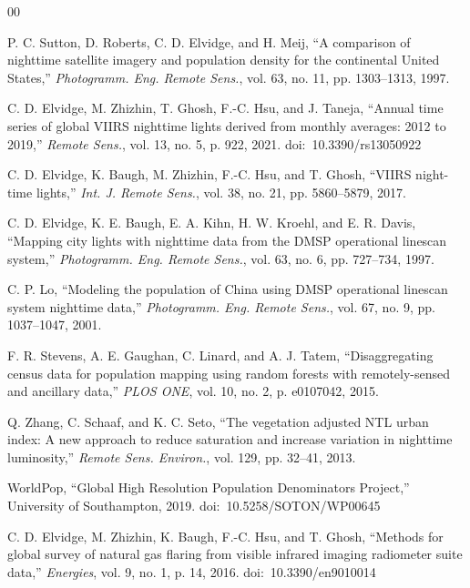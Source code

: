 \documentclass[conference]{IEEEtran}
\begin{document}
\begin{thebibliography}{00}

P. C. Sutton, D. Roberts, C. D. Elvidge, and H. Meij, ``A comparison of nighttime satellite imagery and population density for the continental United States,'' \textit{Photogramm. Eng. Remote Sens.}, vol. 63, no. 11, pp. 1303--1313, 1997.

C. D. Elvidge, M. Zhizhin, T. Ghosh, F.-C. Hsu, and J. Taneja, ``Annual time series of global VIIRS nighttime lights derived from monthly averages: 2012 to 2019,'' \textit{Remote Sens.}, vol. 13, no. 5, p. 922, 2021. doi:~10.3390/rs13050922

C. D. Elvidge, K. Baugh, M. Zhizhin, F.-C. Hsu, and T. Ghosh, ``VIIRS night-time lights,'' \textit{Int. J. Remote Sens.}, vol. 38, no. 21, pp. 5860--5879, 2017.

C. D. Elvidge, K. E. Baugh, E. A. Kihn, H. W. Kroehl, and E. R. Davis, ``Mapping city lights with nighttime data from the DMSP operational linescan system,'' \textit{Photogramm. Eng. Remote Sens.}, vol. 63, no. 6, pp. 727--734, 1997.

C. P. Lo, ``Modeling the population of China using DMSP operational linescan system nighttime data,'' \textit{Photogramm. Eng. Remote Sens.}, vol. 67, no. 9, pp. 1037--1047, 2001.

F. R. Stevens, A. E. Gaughan, C. Linard, and A. J. Tatem, ``Disaggregating census data for population mapping using random forests with remotely-sensed and ancillary data,'' \textit{PLOS ONE}, vol. 10, no. 2, p. e0107042, 2015.

Q. Zhang, C. Schaaf, and K. C. Seto, ``The vegetation adjusted NTL urban index: A new approach to reduce saturation and increase variation in nighttime luminosity,'' \textit{Remote Sens. Environ.}, vol. 129, pp. 32--41, 2013.

WorldPop, ``Global High Resolution Population Denominators Project,'' University of Southampton, 2019. doi:~10.5258/SOTON/WP00645

C. D. Elvidge, M. Zhizhin, K. Baugh, F.-C. Hsu, and T. Ghosh, ``Methods for global survey of natural gas flaring from visible infrared imaging radiometer suite data,'' \textit{Energies}, vol. 9, no. 1, p. 14, 2016. doi:~10.3390/en9010014


\end{thebibliography}
\end{document}
